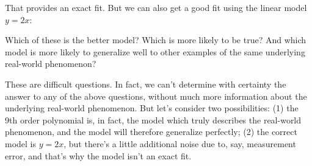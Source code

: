 \documentclass[a4paper,twoside,10pt]{book}
\begin{document}
\begin{center}
\end{center}
That provides an exact fit. But we can also get a good fit using the linear model $y=2x$:
\begin{center}
\end{center}
Which of these is the better model? Which is more likely to be true? And which model is more likely to generalize well to other examples of the same underlying real-world phenomenon?

These are difficult questions. In fact, we can't determine with certainty the answer to any of the above questions, without much more information about the underlying real-world phenomenon. But let's consider two possibilities: (1) the 9th order polynomial is, in fact, the model which truly describes the real-world phenomenon, and the model will therefore generalize perfectly; (2) the correct model is $y=2x$, but there's a little additional noise due to, say, measurement error, and that's why the model isn't an exact fit.
\end{document}
